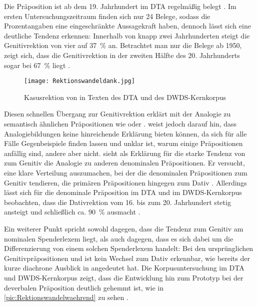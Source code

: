 Die Präposition  ist ab dem 19. Jahrhundert im DTA regelmäßig belegt \citep[s.][]{Vieregge.2019}. 
Im ersten Untersuchungszeitraum finden sich nur 24 Belege, sodass die Prozentangaben eine eingeschränkte Aussagekraft haben, dennoch lässt sich eine deutliche Tendenz erkennen: 
Innerhalb von knapp zwei Jahrhunderten steigt die Genitivrektion von vier auf 37~\% an. 
Betrachtet man nur die Belege ab 1950, zeigt sich, dass die Genitivrektion in der zweiten Hälfte des 20. Jahrhunderts sogar bei 67~\% liegt \citep[s.][]{Vieregge.2019}. 

\begin{figure}
\centering
\texttt{[image: Rektionswandeldank.jpg]}
\caption{Kasusrektion von  in Texten des DTA und des DWDS-Kernkorpus \citep[s.][]{Vieregge.2019}}
\label{pic:Rektionswandeldank}
\end{figure}

Diesen schnellen Übergang zur Genitivrektion erklärt \citet[25]{Agel1992} mit der Analogie zu semantisch ähnlichen Präpositionen wie  oder . 
\citet[176]{DiMeola2004} weist jedoch darauf hin, dass Analogiebildungen keine hinreichende Erkl{\"a}rung bieten können, da sich für alle Fälle Gegenbeispiele finden lassen und unklar ist, warum einige Pr{\"a}positionen anf{\"a}llig sind, andere aber nicht. 
\citet[]{Eisenberg1979} sieht als Erklärung für die starke Tendenz von \dank{} zum Genitiv die Analogie zu anderen denominalen Präpositionen. 
Er versucht, eine klare Verteilung auszumachen, bei der die denominalen Pr{\"a}positionen zum Genitiv tendieren, die prim{\"a}ren Pr{\"a}positionen hingegen zum Dativ \citep[s.][519]{Eisenberg1979}. 
Allerdings lässt sich für die denominale Präposition  im DTA und im DWDS-Kernkorpus beobachten, dass die Dativrektion vom 16. bis zum 20. Jahrhundert stetig ansteigt und schließlich ca. 90~\% ausmacht \citep[s.][]{Vieregge.2019}. 

Ein weiterer Punkt spricht sowohl dagegen, dass die Tendenz zum Genitiv am nominalen Spenderlexem liegt, als auch dagegen, dass es sich dabei um die Differenzierung von einem solchen Spenderlexem handelt: 
Bei den ursprünglichen Genitivpräpositionen \wegen{} und \waehrend{} ist kein Wechsel zum Dativ erkennbar, wie bereits der kurze diachrone Ausblick in \citet[]{DiMeola2000} angedeutet hat. 
Die Korpusuntersuchung im DTA und DWDS-Kernkorpus zeigt, dass die Entwicklung hin zum Prototyp bei der deverbalen Präposition \waehrend{} deutlich gehemmt ist, wie in \autoref{pic:Rektionswandelwaehrend} zu sehen \citep[s.][]{Vieregge.2019}.

